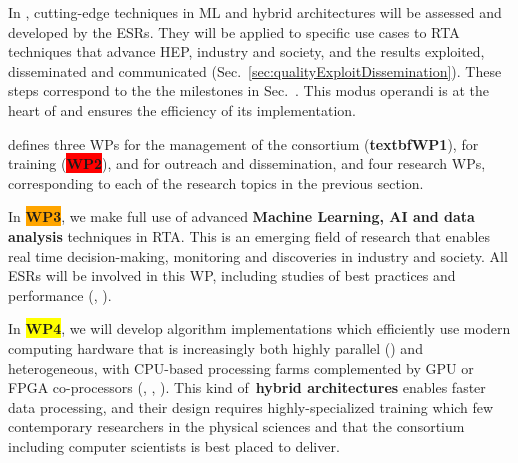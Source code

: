 



In \acronym, cutting-edge techniques in ML and hybrid architectures will be assessed and developed by the ESRs. They will be applied to specific use cases to RTA techniques that advance HEP, industry and society, and the results exploited, disseminated and communicated (Sec.~\ref{sec:qualityExploitDissemination}). These steps correspond to the the milestones in Sec.~\label{sub:milestones}. This modus operandi is at the heart of \acronym and ensures the efficiency of its implementation. 

\acronym defines three WPs for the management of the consortium (\textbf{textbf{\color{white}WP1\color{black}}}), for training (\textbf{\colorbox{red}{WP2}}), and for outreach and dissemination, and four research WPs, corresponding to each of the research topics in the previous section. 

In \textbf{\colorbox{orange}{WP3}}\color{black}, we make full use of advanced \textbf{Machine Learning, AI and data analysis} techniques in RTA. This is an emerging field of research that enables real time decision-making, monitoring and discoveries in industry and society. All ESRs will be involved in this WP, including studies of best practices and performance (\ESRh, \ESRi).

In \textbf{\colorbox{yellow}{WP4}}, we will develop algorithm implementations which efficiently use modern computing hardware that is increasingly both highly parallel (\ESRc) and heterogeneous, with CPU-based processing farms complemented by GPU or FPGA co-processors (\ESRf, \ESRg, \ESRl). 
This kind of~\textbf{hybrid architectures} enables faster data processing, and their design requires highly-specialized training which few contemporary researchers in the physical sciences and that the consortium including computer scientists is best placed to deliver. 


